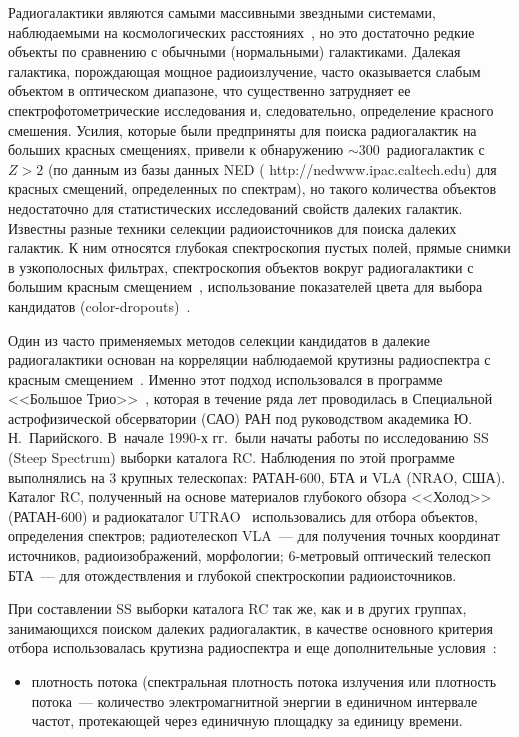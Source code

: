 \begin{multicols}{2}
     Радиогалактики являются самыми массивными звездными системами,
наблюдаемыми на космологических расстояниях~\cite{Spinrad}, но это достаточно редкие
объекты по сравнению с обычными (нормальными) галактиками. Далекая галактика,
по\-рож\-да\-ющая мощное радиоизлучение, часто оказывается слабым объектом в оптическом
диапазоне, что существенно затрудняет ее спектрофотометрические исследования и,
следовательно, определение красного смешения. Усилия, которые были предприняты для
поиска радиогалактик на больших красных смещениях, привели к обнаружению
$\sim300$~радиогалактик с $Z > 2$ (по данным из базы данных NED ({\sf
http://nedwww.ipac.caltech.edu}) для красных смещений, определенных по спектрам), но
такого количества объектов недостаточно для статистических исследований свойств
далеких галактик. Известны разные техники селекции радиоисточников для поиска
далеких галактик. К ним относятся глубокая спектроскопия пустых полей, прямые снимки
в узкополосных фильтрах, спектроскопия объектов вокруг радиогалактики с большим
красным смещением~\cite{Venemans, Overzier}, использование показателей цвета для
выбора кандидатов (color-dropouts)~\cite{Madau}.

     Один из часто применяемых методов селекции кандидатов в далекие радиогалактики
основан на корреляции наблюдаемой крутизны радиоспектра с красным
смещением~\cite{Rttgering}. Именно этот подход использовался в программе <<Большое
Трио>>~\cite{Par96}, которая в течение ряда лет проводилась в Специальной
астрофизической обсерватории (САО) РАН под
руководством академика Ю.\,Н.~Парийского. В~начале 1990-х гг.\ были начаты работы по
исследованию SS (Steep Spectrum) выборки каталога RC. Наблюдения по этой программе
выполнялись на 3 крупных телескопах: РАТАН-600,  БТА и VLA (NRAO, США). Каталог
RC, полученный на основе материалов глубокого обзора <<Холод>> (РАТАН-600) и
радиокаталог UTRAO~\cite{Douglas} использовались для отбора объектов, определения
спектров; радиотелескоп VLA~--- для получения точных координат источников,
радиоизображений, морфологии; 6-мет\-ро\-вый оптический телескоп БТА~--- для отождествления и
глубокой спектроскопии радиоисточников.

     При составлении SS выборки каталога RC так же, как и в других группах,
занимающихся поиском далеких радиогалактик, в качестве основного критерия отбора
использовалась крутизна радиоспектра и еще дополнительные условия~\cite{Копылов}:
     \begin{itemize}
\item плотность потока (спектральная плотность %
потока излучения или плотность потока~---
количество электромагнитной энергии в единичном интервале частот,
протекающей через единичную площадку за единицу времени.


\end{itemize}
\end{multicols}
